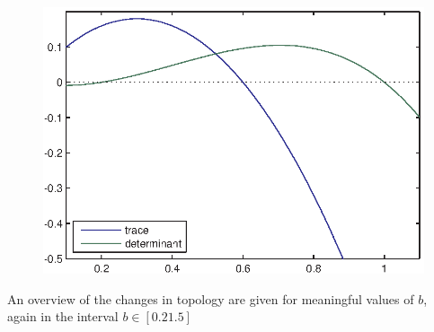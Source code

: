 \begin{figure}[htp]
\centering
\includegraphics{img/ex3/tracedeterminant.eps}
\caption{}
\label{fig:ex3tracedeterminant}
\end{figure}
\newline An overview of the changes in topology are given for meaningful values of $b$, again in the interval $b\in[0.2 1.5]$
